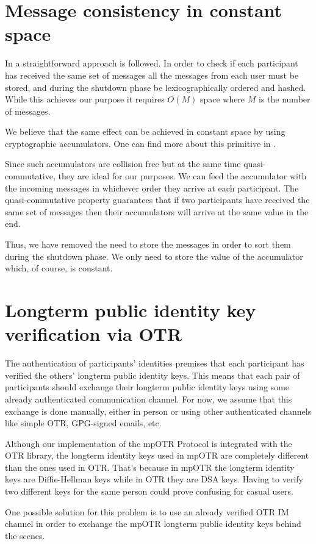 \section{Message consistency in constant space}
In \cite{mpotr} a straightforward approach is followed. In order to check if
each participant has received the same set of messages all the messages from
each user must be stored, and during the shutdown phase be lexicographically
ordered and hashed. While this achieves our purpose it requires $O(M)$ space
where $M$ is the number of messages.

We believe that the same effect can be achieved in constant space by using
cryptographic accumulators. One can find more about this primitive in \cite{accum_def}.

Since such accumulators are collision free but at the same time quasi-commutative,
they are ideal for our purposes. We can feed the accumulator with the incoming
messages in whichever order they arrive at each participant. The quasi-commutative
property guarantees that if two participants have received the same set of messages
then their accumulators will arrive at the same value in the end.

Thus, we have removed the need to store the messages in order to sort them during
the shutdown phase. We only need to store the value of the accumulator which,
of course, is constant.

\section{Longterm public identity key verification via OTR}
The authentication of participants' identities premises that each participant has verified the others' longterm public identity keys. This means that each pair of participants should exchange their longterm public identity keys using some already authenticated communication channel. For now, we assume that this exchange is done manually, either in person or using other authenticated channels like simple OTR, GPG-signed emails, etc.

Although our implementation of the mpOTR Protocol is integrated with the OTR library, the longterm identity keys used in mpOTR are completely different than the ones used in OTR. That's because in mpOTR the longterm identity keys are Diffie-Hellman keys while in OTR they are DSA keys. Having to verify two different keys for the same person could prove confusing for casual users.

One possible solution for this problem is to use an already verified OTR IM channel in order to exchange the mpOTR longterm public identity keys behind the scenes.

